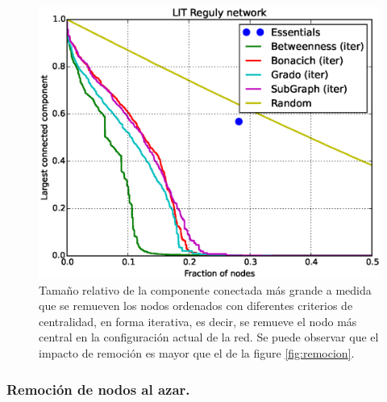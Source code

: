 \begin{figure}
\includegraphics[scale = 0.3]{figuras/LIT_Reguly} 
\caption{Tamaño relativo de la componente conectada más grande a medida que se remueven los nodos ordenados con diferentes criterios de centralidad, en forma iterativa, es decir, se remueve el nodo más central en la configuración actual de la red. Se puede observar que el impacto de remoción es mayor que el de la figure \ref{fig:remocion}.}
\label{fig:remocion_alternativo}
\end{figure}

\subsubsection{Remoción de nodos al azar.}

